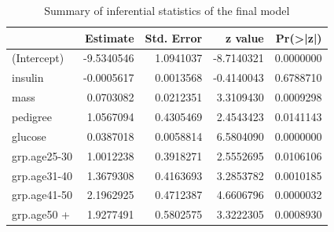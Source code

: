 \documentclass[
]{book}
\newenvironment{Shaded}{\begin{snugshade}}{\end{snugshade}}
\newcommand{\AttributeTok}[1]{\textcolor[rgb]{0.13,0.29,0.53}{#1}}
\newcommand{\ControlFlowTok}[1]{\textcolor[rgb]{0.13,0.29,0.53}{\textbf{#1}}}
\newcommand{\DocumentationTok}[1]{\textcolor[rgb]{0.56,0.35,0.01}{\textbf{\textit{#1}}}}
\newcommand{\FloatTok}[1]{\textcolor[rgb]{0.00,0.00,0.81}{#1}}
\newcommand{\FunctionTok}[1]{\textcolor[rgb]{0.13,0.29,0.53}{\textbf{#1}}}
\newcommand{\NormalTok}[1]{#1}
\newcommand{\OtherTok}[1]{\textcolor[rgb]{0.56,0.35,0.01}{#1}}
\newcommand{\SpecialCharTok}[1]{\textcolor[rgb]{0.81,0.36,0.00}{\textbf{#1}}}
\newcommand{\StringTok}[1]{\textcolor[rgb]{0.31,0.60,0.02}{#1}}
\begin{document}
\begin{table}

\caption{\label{tab:unnamed-chunk-123}Summary of inferential statistics of the final model}
\centering
\begin{tabular}[t]{l|r|r|r|r}
\hline
  & Estimate & Std. Error & z value & Pr(>|z|)\\
\hline
(Intercept) & -9.5340546 & 1.0941037 & -8.7140321 & 0.0000000\\
\hline
insulin & -0.0005617 & 0.0013568 & -0.4140043 & 0.6788710\\
\hline
mass & 0.0703082 & 0.0212351 & 3.3109430 & 0.0009298\\
\hline
pedigree & 1.0567094 & 0.4305469 & 2.4543423 & 0.0141143\\
\hline
glucose & 0.0387018 & 0.0058814 & 6.5804090 & 0.0000000\\
\hline
grp.age25-30 & 1.0012238 & 0.3918271 & 2.5552695 & 0.0106106\\
\hline
grp.age31-40 & 1.3679308 & 0.4163693 & 3.2853782 & 0.0010185\\
\hline
grp.age41-50 & 2.1962925 & 0.4712387 & 4.6606796 & 0.0000032\\
\hline
grp.age50 + & 1.9277491 & 0.5802575 & 3.3222305 & 0.0008930\\
\hline
\end{tabular}
\end{table}

\begin{Shaded}
\end{Shaded}
\end{document}
